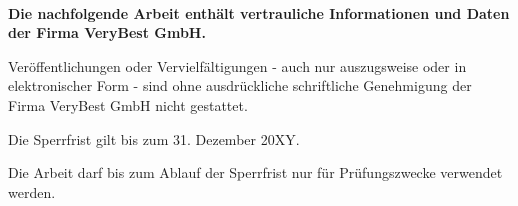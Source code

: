 \newpage
\thispagestyle{empty}


\\ 

\vspace*{2cm}
\bfseries
\noindent Die nachfolgende Arbeit enthält vertrauliche Informationen und Daten der Firma
VeryBest GmbH. 

\medskip
\noindent Veröffentlichungen oder Vervielfältigungen - auch nur auszugsweise oder in
elektronischer Form - sind ohne ausdrückliche schriftliche Genehmigung der
Firma VeryBest GmbH nicht gestattet.
\medskip

\noindent Die Sperrfrist gilt bis zum 31. Dezember 20XY.

\medskip
\noindent Die Arbeit darf bis zum Ablauf der Sperrfrist nur für Prüfungszwecke verwendet
werden.
\normalfont